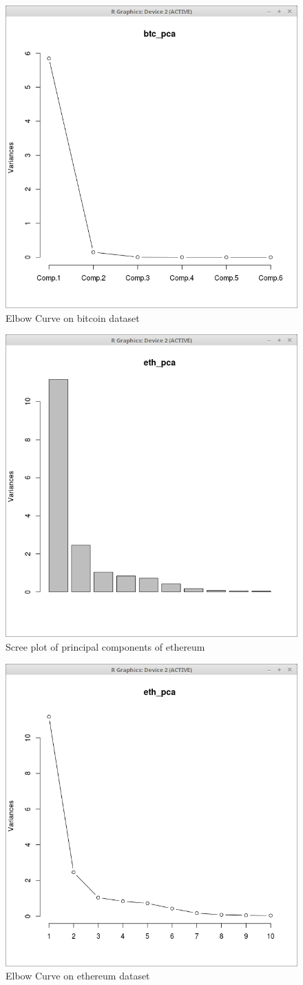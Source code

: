 \documentclass{article}
\begin{document}
\begin{figure}[ht]
	\centering
	\includegraphics[width = 6 cm]{bitcoin_pca_elbow.png}
	\caption{Elbow Curve on bitcoin dataset}
	\label{fig: btc_pca_elbow}
\end{figure}
\newpage

\begin{figure}[ht]
	\centering
	\includegraphics[width = 6 cm]{ethereum_pca.png}
	\caption{Scree plot of principal components of ethereum}
	\label{fig: eth_pca}
\end{figure}

\begin{figure}[ht]
	\centering
	\includegraphics[width = 6 cm]{ethereum_pca_elbow.png}
	\caption{Elbow Curve on ethereum dataset}
	\label{fig: eth_pca_elbow}
\end{figure}
\end{document}
